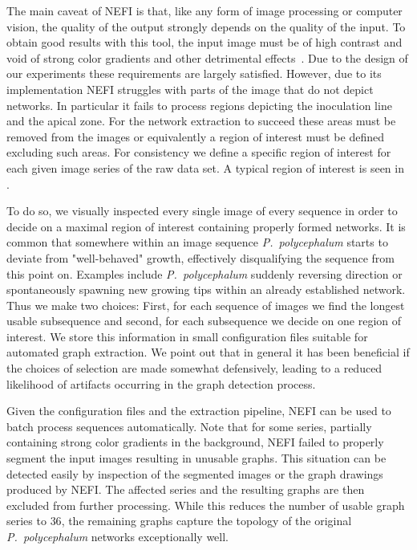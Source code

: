 	      The main caveat of NEFI is that, like any form of image processing or computer vision, the quality of the output strongly depends on the quality of the input. To obtain good results with this tool, the input image must be of high contrast and void of strong color gradients and other detrimental effects~\cite{dirnberger2015nefi}. Due to the design of our experiments these requirements are largely satisfied. However, due to its implementation NEFI struggles with parts of the image that do not depict networks. In particular it fails to process regions depicting the inoculation line and the apical zone. For the network extraction to succeed these areas must be removed from the images or equivalently a region of interest must be defined excluding such areas. For consistency we define a specific region of interest for each given image series of the raw data set. A typical region of interest is seen in .

	      To do so, we visually inspected every single image of every sequence in order to decide on a maximal region of interest containing properly formed networks. It is common that somewhere within an image sequence \emph{P.~polycephalum} starts to deviate from "well-behaved" growth, effectively disqualifying the sequence from this point on. Examples include \emph{P.~polycephalum} suddenly reversing direction or spontaneously spawning new growing tips within an already established network. Thus we make two choices: First, for each sequence of images we find the longest usable subsequence and second, for each subsequence we decide on one region of interest. We store this information in small configuration files suitable for automated graph extraction. We point out that in general it has been beneficial if the choices of selection are made somewhat defensively, leading to a reduced likelihood of artifacts occurring in the graph detection process.  

	      Given the configuration files and the extraction pipeline, NEFI can be used to batch process sequences automatically. Note that for some series, partially containing strong color gradients in the background, NEFI failed to properly segment the input images resulting in unusable graphs. This situation can be detected easily by inspection of the segmented images or the graph drawings produced by NEFI. The affected series and the resulting graphs are then excluded from further processing. While this reduces the number of usable graph series to $36$, the remaining graphs capture the topology of the original \emph{P.~polycephalum} networks exceptionally well. 


